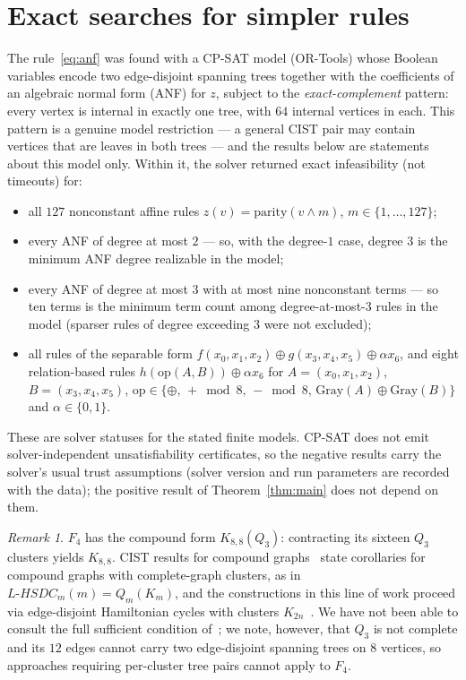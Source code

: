 \documentclass[11pt]{article}
\theoremstyle{remark}
\newtheorem{remark}{Remark}
\begin{document}
\section{Exact searches for simpler rules}\label{sec:searches}

The rule~\eqref{eq:anf} was found with a CP-SAT model (OR-Tools) whose
Boolean variables encode two edge-disjoint spanning trees together with the
coefficients of an algebraic normal form (ANF) for $z$, subject to the
\emph{exact-complement} pattern: every vertex is internal in exactly one
tree, with $64$ internal vertices in each. This pattern is a genuine model
restriction --- a general CIST pair may contain vertices that are leaves in
both trees --- and the results below are statements about this model only.
Within it, the solver returned exact infeasibility (not timeouts) for:
\begin{itemize}
\item all $127$ nonconstant affine rules
$z(v)=\mathrm{parity}(v\wedge m)$, $m\in\{1,\dots,127\}$;
\item every ANF of degree at most $2$ --- so, with the degree-$1$ case,
degree $3$ is the minimum ANF degree realizable in the model;
\item every ANF of degree at most $3$ with at most nine nonconstant terms
--- so ten terms is the minimum term count among degree-at-most-$3$ rules
in the model (sparser rules of degree exceeding $3$ were not excluded);
\item all rules of the separable form $f(x_0,x_1,x_2)\oplus
g(x_3,x_4,x_5)\oplus\alpha x_6$, and eight relation-based rules
$h(\mathrm{op}(A,B))\oplus\alpha x_6$ for $A=(x_0,x_1,x_2)$,
$B=(x_3,x_4,x_5)$, $\mathrm{op}\in\{\oplus,\,+\bmod 8,\,-\bmod 8,\,
\mathrm{Gray}(A)\oplus\mathrm{Gray}(B)\}$ and $\alpha\in\{0,1\}$.
\end{itemize}
These are solver statuses for the stated finite models. CP-SAT does not
emit solver-independent unsatisfiability certificates, so the negative
results carry the solver's usual trust assumptions (solver version and run
parameters are recorded with the data); the positive result of
Theorem~\ref{thm:main} does not depend on them.

\begin{remark}\label{rem:compound}
$F_4$ has the compound form $K_{8,8}(Q_3)$: contracting its sixteen $Q_3$
clusters yields $K_{8,8}$. CIST results for compound
graphs~\cite{QinHaoChang2020} state corollaries for compound graphs with
complete-graph clusters, as in $L\text{-}HSDC_m(m)=Q_m(K_m)$, and the
constructions in this line of work proceed via edge-disjoint Hamiltonian
cycles with clusters $K_{2n}$~\cite{ChengWangFan2023}. We have not been
able to consult the full sufficient condition of~\cite{QinHaoChang2020};
we note, however, that $Q_3$ is not complete and its $12$ edges cannot
carry two edge-disjoint spanning trees on $8$ vertices, so approaches
requiring per-cluster tree pairs cannot apply to $F_4$.
\end{remark}
\end{document}
